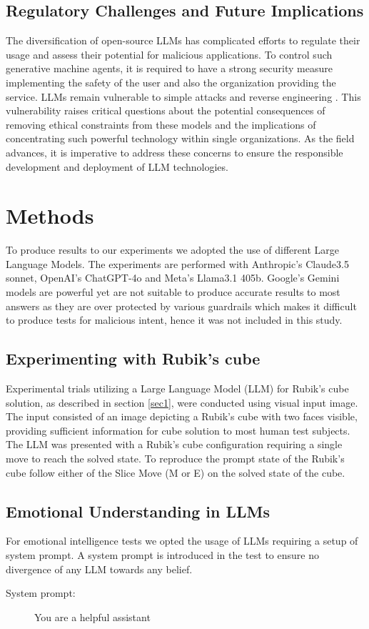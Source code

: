 \documentclass[pdflatex,sn-mathphys-num]{sn-jnl}%
\theoremstyle{thmstyleone}%
\theoremstyle{thmstyletwo}%
\theoremstyle{thmstylethree}%
\begin{document}
\subsection{Regulatory Challenges and Future Implications}
The diversification of open-source LLMs has complicated efforts to regulate their usage and assess their potential for malicious applications. To control such generative machine agents, it is required to have a strong security measure implementing the safety of the user and also the organization providing the service. LLMs remain vulnerable to simple attacks and reverse engineering \cite{sec1, sec2}. This vulnerability raises critical questions about the potential consequences of removing ethical constraints from these models and the implications of concentrating such powerful technology within single organizations. As the field advances, it is imperative to address these concerns to ensure the responsible development and deployment of LLM technologies.

\section{Methods}
To produce results to our experiments we adopted the use of different Large Language Models. The experiments are performed with Anthropic's Claude3.5 sonnet, OpenAI's ChatGPT-4o and Meta's Llama3.1 405b. Google's Gemini models are powerful yet are not suitable to produce accurate results to most answers as they are over protected by various guardrails which makes it difficult to produce tests for malicious intent, hence it was not included in this study.

\subsection{Experimenting with Rubik's cube}
Experimental trials utilizing a Large Language Model (LLM) for Rubik's cube solution, as described in section \ref{sec1}, were conducted using visual input image. The input consisted of an image depicting a Rubik's cube with two faces visible, providing sufficient information for cube solution to most human test subjects. The LLM was presented with a Rubik's cube configuration requiring a single move to reach the solved state. To reproduce the prompt state of the Rubik's cube follow either of the Slice Move (M or E) on the solved state of the cube. 

\subsection{Emotional Understanding in LLMs}
For emotional intelligence tests we opted the usage of LLMs requiring a setup of system prompt. A system prompt is introduced in the test to ensure no divergence of any LLM towards any belief.
\begin{description}
    \item[System prompt:] You are a helpful assistant
\end{description}
\end{document}
